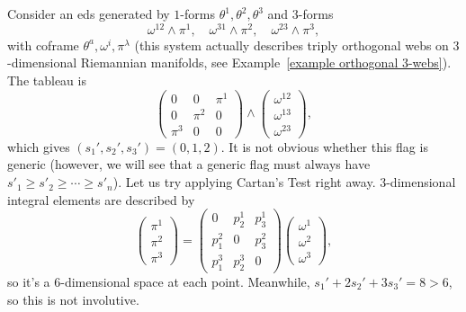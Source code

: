 \begin{example}[Borrowing]\label{example tableau of orthogonal 3-webs}
    Consider an \gls{eds} generated by $1$-forms $\theta^1,\theta^2,\theta^3$ and $3$-forms 
    \[\omega^{12}\wedge\pi^1,\quad \omega^{31}\wedge\pi^2,\quad \omega^{23}\wedge\pi^3,\]
    with coframe $\theta^a,\omega^i,\pi^\lambda$ (this system actually describes triply orthogonal webs on $3$-dimensional Riemannian manifolds, see Example~\ref{example orthogonal 3-webs}). The tableau is 
    \[
    \left(\begin{array}{|c|cc}
        0 & 0 & \boxed{\pi^1}\\
        0 & \boxed{\pi^2} & 0\\
        \boxed{\pi^3} & 0 & 0
    \end{array}\right)\wedge 
    \left(\begin{array}{c} \hline 
        \omega^{12}\\ \hline
        \omega^{13}\\
        \omega^{23}
    \end{array}\right),
    \]
    which gives $(s_1',s_2',s_3')=(0,1,2)$. It is not obvious whether this flag is generic (however, we will see that a generic flag must always have $s'_1\geq s'_2\geq\cdots\geq s'_n$). Let us try applying Cartan's Test right away. $3$-dimensional integral elements are described by 
    \[\begin{pmatrix}
        \pi^1\\\pi^2\\\pi^3
    \end{pmatrix}
    =\begin{pmatrix}
        0 & p^1_2 & p^1_3\\
        p^2_1 & 0 & p^2_3\\
        p^3_1 & p^3_2 & 0
    \end{pmatrix}
    \begin{pmatrix}
        \omega^1\\\omega^2\\\omega^3
    \end{pmatrix},
    \]
    so it's a $6$-dimensional space at each point. Meanwhile, $s_1'+2s_2'+3s_3'=8>6$, so this is not involutive. 


\end{example}
